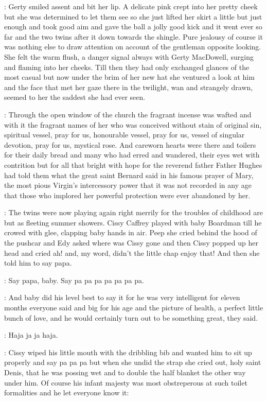 :
Gerty smiled assent and bit her lip.
A delicate pink crept into her
pretty cheek but she was determined to let them see so she just lifted her
skirt a little but just enough and took good aim and gave the ball a jolly
good kick and it went ever so far and the two twins after it down towards
the shingle.
Pure jealousy of course it was nothing else to draw attention
on account of the gentleman opposite looking.
She felt the warm flush,
a
danger signal always with Gerty MacDowell,
surging and flaming into her
cheeks.
Till then they had only exchanged glances of the most casual but
now under the brim of her new hat she ventured a look at him and the face
that met her gaze there in the twilight,
wan and strangely drawn,
seemed to her
the saddest she had ever seen.

:
Through the open window of the church the fragrant incense was wafted and
with it the fragrant names of her who was conceived without stain of
original sin,
spiritual vessel,
pray for us,
honourable vessel,
pray for
us,
vessel of singular devotion,
pray for us,
mystical rose.
And careworn
hearts were there and toilers for their daily bread and many who had erred
and wandered,
their eyes wet with contrition but for all that bright with
hope for the reverend father Father Hughes had told them what the great
saint Bernard said in his famous prayer of Mary,
the most pious Virgin's
intercessory power that it was not recorded in any age that those who
implored her powerful protection
were ever abandoned by her.

:
The twins were now playing again right merrily for the troubles of
childhood are but as fleeting summer showers.
Cissy Caffrey played with
baby Boardman till he crowed with glee,
clapping baby hands in air.
Peep
she cried behind the hood of the pushcar and Edy asked where was Cissy
gone and then Cissy popped up her head and cried ah!
and,
my word,
didn't the little chap enjoy that!
And then she told him to say papa.

\cissy:
Say papa,
baby.
Say pa pa pa pa pa pa pa.

:
And baby did his level best to say it for he was very intelligent for
eleven months everyone said and big for his age and the picture of health,
a perfect little bunch of love,
and he would certainly turn out to be something great,
they said.

\baby:
Haja ja ja haja.

:
Cissy wiped his little mouth with the dribbling bib and wanted him to sit
up properly and say pa pa pa but when she undid the strap she cried out,
holy saint Denis,
that he was possing wet and to double the half blanket
the other way under him.
Of course his infant majesty was most
obstreperous at such toilet formalities and he let everyone know it:

